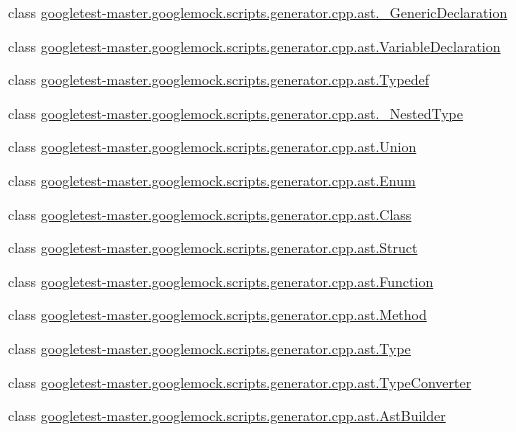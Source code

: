 \begin{DoxyCompactItemize}
\item 
class \mbox{\hyperlink{classgoogletest-master_1_1googlemock_1_1scripts_1_1generator_1_1cpp_1_1ast_1_1___generic_declaration}{googletest-\/master.\+googlemock.\+scripts.\+generator.\+cpp.\+ast.\+\_\+\+Generic\+Declaration}}
\item 
class \mbox{\hyperlink{classgoogletest-master_1_1googlemock_1_1scripts_1_1generator_1_1cpp_1_1ast_1_1_variable_declaration}{googletest-\/master.\+googlemock.\+scripts.\+generator.\+cpp.\+ast.\+Variable\+Declaration}}
\item 
class \mbox{\hyperlink{classgoogletest-master_1_1googlemock_1_1scripts_1_1generator_1_1cpp_1_1ast_1_1_typedef}{googletest-\/master.\+googlemock.\+scripts.\+generator.\+cpp.\+ast.\+Typedef}}
\item 
class \mbox{\hyperlink{classgoogletest-master_1_1googlemock_1_1scripts_1_1generator_1_1cpp_1_1ast_1_1___nested_type}{googletest-\/master.\+googlemock.\+scripts.\+generator.\+cpp.\+ast.\+\_\+\+Nested\+Type}}
\item 
class \mbox{\hyperlink{classgoogletest-master_1_1googlemock_1_1scripts_1_1generator_1_1cpp_1_1ast_1_1_union}{googletest-\/master.\+googlemock.\+scripts.\+generator.\+cpp.\+ast.\+Union}}
\item 
class \mbox{\hyperlink{classgoogletest-master_1_1googlemock_1_1scripts_1_1generator_1_1cpp_1_1ast_1_1_enum}{googletest-\/master.\+googlemock.\+scripts.\+generator.\+cpp.\+ast.\+Enum}}
\item 
class \mbox{\hyperlink{classgoogletest-master_1_1googlemock_1_1scripts_1_1generator_1_1cpp_1_1ast_1_1_class}{googletest-\/master.\+googlemock.\+scripts.\+generator.\+cpp.\+ast.\+Class}}
\item 
class \mbox{\hyperlink{classgoogletest-master_1_1googlemock_1_1scripts_1_1generator_1_1cpp_1_1ast_1_1_struct}{googletest-\/master.\+googlemock.\+scripts.\+generator.\+cpp.\+ast.\+Struct}}
\item 
class \mbox{\hyperlink{classgoogletest-master_1_1googlemock_1_1scripts_1_1generator_1_1cpp_1_1ast_1_1_function}{googletest-\/master.\+googlemock.\+scripts.\+generator.\+cpp.\+ast.\+Function}}
\item 
class \mbox{\hyperlink{classgoogletest-master_1_1googlemock_1_1scripts_1_1generator_1_1cpp_1_1ast_1_1_method}{googletest-\/master.\+googlemock.\+scripts.\+generator.\+cpp.\+ast.\+Method}}
\item 
class \mbox{\hyperlink{classgoogletest-master_1_1googlemock_1_1scripts_1_1generator_1_1cpp_1_1ast_1_1_type}{googletest-\/master.\+googlemock.\+scripts.\+generator.\+cpp.\+ast.\+Type}}
\item 
class \mbox{\hyperlink{classgoogletest-master_1_1googlemock_1_1scripts_1_1generator_1_1cpp_1_1ast_1_1_type_converter}{googletest-\/master.\+googlemock.\+scripts.\+generator.\+cpp.\+ast.\+Type\+Converter}}
\item 
class \mbox{\hyperlink{classgoogletest-master_1_1googlemock_1_1scripts_1_1generator_1_1cpp_1_1ast_1_1_ast_builder}{googletest-\/master.\+googlemock.\+scripts.\+generator.\+cpp.\+ast.\+Ast\+Builder}}
\end{DoxyCompactItemize}
